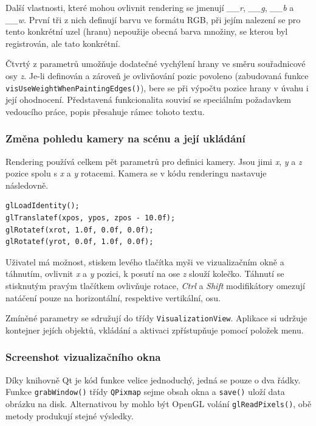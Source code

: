 \documentclass[11pt,twoside,a4paper]{book}
\begin{document}
Další vlastnosti, které mohou ovlivnit rendering se jmenují \textit{\_\_r}, \textit{\_\_g}, \textit{\_\_b} a \textit{\_\_w}. První tři z nich definují barvu ve formátu RGB, při jejím nalezení se pro tento konkrétní uzel (hranu) nepoužije obecná barva množiny, se kterou byl registrován, ale tato konkrétní.

Čtvrtý z parametrů umožňuje dodatečné vychýlení hrany ve směru souřadnicové osy \textit{z}. Je-li definován a zároveň je ovlivňování pozic povoleno (zabudovaná funkce \texttt{vis\-Use\-Weight\-When\-Pa\-in\-ting\-Ed\-ges()}), bere se při výpočtu pozice hrany v úvahu i její ohodnocení. Představená funkcionalita souvisí se speciálním požadavkem vedoucího práce, popis přesahuje rámec tohoto textu.


\subsubsection{Změna pohledu kamery na scénu a její ukládání}

Rendering používá celkem pět parametrů pro definici kamery. Jsou jimi \textit{x}, \textit{y} a \textit{z} pozice spolu s \textit{x} a \textit{y} rotacemi. Kamera se v kódu renderingu nastavuje následovně.

\begin{verbatim}
glLoadIdentity();
glTranslatef(xpos, ypos, zpos - 10.0f);
glRotatef(xrot, 1.0f, 0.0f, 0.0f);
glRotatef(yrot, 0.0f, 1.0f, 0.0f);
\end{verbatim}

Uživatel má možnost, stiskem levého tlačítka myši ve vizualizačním okně a táhnutím, ovlivnit \textit{x} a \textit{y} pozici, k posutí na ose \textit{z} slouží kolečko. Táhnutí se stisknutým pravým tlačítkem ovlivňuje rotace, \textit{Ctrl} a \textit{Shift} modifikátory omezují natáčení pouze na horizontální, respektive vertikální, osu.

Zmíněné parametry se sdružují do třídy \texttt{VisualizationView}. Aplikace si udržuje kontejner jejích objektů, vkládání a aktivaci zpřístupňuje pomocí položek menu.


\subsubsection{Screenshot vizualizačního okna}

Díky knihovně Qt je kód funkce velice jednoduchý, jedná se pouze o dva řádky. Funkce \texttt{grabWindow()} třídy \texttt{QPixmap} sejme obsah okna a \texttt{save()} uloží data obrázku na disk. Alternativou by mohlo být OpenGL volání \texttt{glReadPixels()}, obě metody produkují stejné výsledky.
\end{document}
